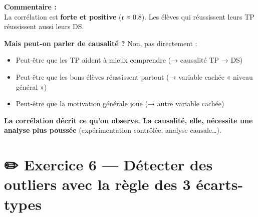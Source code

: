 \documentclass[
  french,
  11pt,
  a4paper,
]{scrbook}
\providecommand{\tightlist}{%
  \setlength{\itemsep}{0pt}\setlength{\parskip}{0pt}}
\begin{document}
\begin{tcolorbox}
\textbf{Commentaire :}\\
La corrélation est \textbf{forte et positive} (r ≈ 0.8). Les élèves qui
réussissent leurs TP réussissent aussi leurs DS.

\textbf{Mais peut-on parler de causalité ?} Non, pas directement :

\begin{itemize}
\tightlist
\item
  Peut-être que les TP aident à mieux comprendre (→ causalité TP → DS)
\item
  Peut-être que les bons élèves réussissent partout (→ variable cachée «
  niveau général »)
\item
  Peut-être que la motivation générale joue (→ autre variable cachée)
\end{itemize}

\textbf{La corrélation décrit ce qu'on observe. La causalité, elle,
nécessite une analyse plus poussée} (expérimentation contrôlée, analyse
causale\ldots).

\end{tcolorbox}

\section{✏️ Exercice 6 --- Détecter des outliers avec la règle des 3
écarts-types}\label{exercice-6-duxe9tecter-des-outliers-avec-la-ruxe8gle-des-3-uxe9carts-types}
\end{document}
